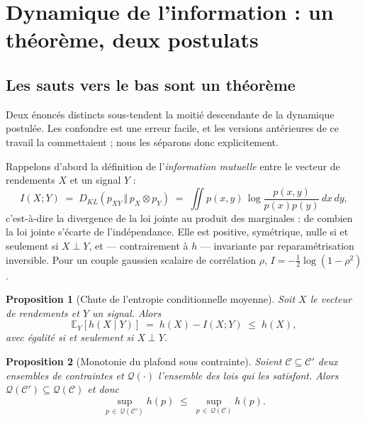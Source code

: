 \documentclass[11pt]{article}
\newtheorem{proposition}{Proposition}
\theoremstyle{definition}
\theoremstyle{remark}
\newcommand{\KL}[2]{D_{KL}\!\left(#1\,\Vert\,#2\right)}
\begin{document}
\section{Dynamique de l'information : un théorème, deux postulats}
\label{sec:dynamics}

\subsection{Les sauts vers le bas sont un théorème}

Deux énoncés distincts sous-tendent la moitié descendante de la dynamique
postulée. Les confondre est une erreur facile, et les versions antérieures de ce
travail la commettaient ; nous les séparons donc explicitement.

Rappelons d'abord la définition de l'\emph{information mutuelle} entre le
vecteur de rendements $X$ et un signal $Y$ :
\begin{equation}
\label{eq:mi}
I(X;Y) \;=\; \KL{p_{XY}}{p_X\otimes p_Y}
\;=\; \iint p(x,y)\,\log\frac{p(x,y)}{p(x)p(y)}\,dx\,dy ,
\end{equation}
c'est-à-dire la divergence de la loi jointe au produit des marginales : de
combien la loi jointe s'écarte de l'indépendance. Elle est positive, symétrique,
nulle si et seulement si $X\perp Y$, et --- contrairement à $h$ --- invariante par
reparamétrisation inversible. Pour un couple gaussien scalaire de corrélation
$\rho$, $I=-\tfrac12\log(1-\rho^2)$.

\begin{proposition}[Chute de l'entropie conditionnelle moyenne]
\label{prop:conditioning}
Soit $X$ le vecteur de rendements et $Y$ un signal. Alors
\begin{equation*}
\mathbb{E}_Y\!\left[h(X\mid Y)\right] \;=\; h(X) - I(X;Y) \;\le\; h(X),
\end{equation*}
avec égalité si et seulement si $X\perp Y$.
\end{proposition}

\begin{proposition}[Monotonie du plafond sous contrainte]
\label{prop:constraint}
Soient $\mathcal{C}\subseteq\mathcal{C}'$ deux ensembles de contraintes et
$\mathcal{Q}(\cdot)$ l'ensemble des lois qui les satisfont. Alors
$\mathcal{Q}(\mathcal{C}')\subseteq\mathcal{Q}(\mathcal{C})$ et donc
\begin{equation*}
\sup_{p\,\in\,\mathcal{Q}(\mathcal{C}')} h(p) \;\le\; \sup_{p\,\in\,\mathcal{Q}(\mathcal{C})} h(p).
\end{equation*}
\end{proposition}
\end{document}
